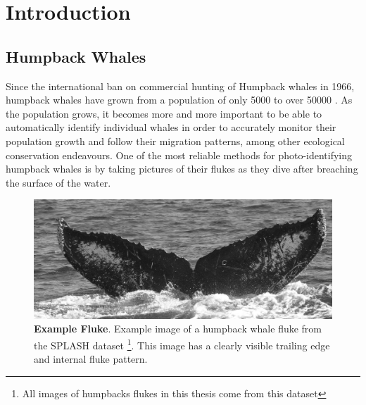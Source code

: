  
\chapter{Introduction} \label{sec:introduction}
 
\section{Humpback Whales}

Since the international ban on commercial hunting of Humpback whales in 1966, humpback whales have grown from a population of only 5000 \cite{baker1993abundant} to over 50000 \cite{branch2011humpback}. 
As the population grows, it becomes more and more important to be able to automatically identify individual whales in order to accurately monitor their population growth and follow their migration patterns, among other ecological conservation endeavours.
One of the most reliable methods for photo-identifying humpback whales is by taking pictures of their flukes as they dive after breaching the surface of the water.


\begin{figure}[t]%
\centering
\includegraphics[width=1.0\textwidth]{../images/fluke_aid88_goodmatching.jpg}
\caption[]{\textbf{Example Fluke}. Example image of a humpback whale fluke from the SPLASH \cite{calambokidis2008splash} dataset \footnote{All images of humpbacks flukes in this thesis come from this dataset}. This image has a clearly visible trailing edge and internal fluke pattern.}
\label{fig:example_fluke}
\end{figure}

